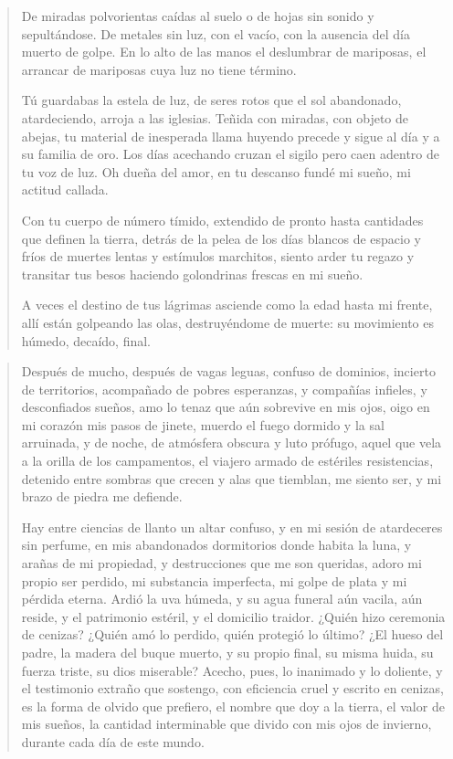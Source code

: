 \documentclass[12pt]{article}
\begin{document}
\clearpage
{}
\begin{verse}
De miradas polvorientas caídas al suelo  
o de hojas sin sonido y sepultándose.  
De metales sin luz, con el vacío,  
con la ausencia del día muerto de golpe.  
En lo alto de las manos el deslumbrar de mariposas,  
el arrancar de mariposas cuya luz no tiene término.  
  
Tú guardabas la estela de luz, de seres rotos  
que el sol abandonado, atardeciendo, arroja a las iglesias.  
Teñida con miradas, con objeto de abejas,  
tu material de inesperada llama huyendo  
precede y sigue al día y a su familia de oro.  
Los días acechando cruzan el sigilo  
pero caen adentro de tu voz de luz.  
Oh dueña del amor, en tu descanso  
fundé mi sueño, mi actitud callada.  
  
Con tu cuerpo de número tímido, extendido de pronto  
hasta cantidades que definen la tierra,  
detrás de la pelea de los días blancos de espacio  
y fríos de muertes lentas y estímulos marchitos,  
siento arder tu regazo y transitar tus besos  
haciendo golondrinas frescas en mi sueño.  
  
A veces el destino de tus lágrimas asciende  
como la edad hasta mi frente, allí  
están golpeando las olas, destruyéndome de muerte:  
su movimiento es húmedo, decaído, final.

\end{verse}

\clearpage
{}
\begin{verse}
Después de mucho, después de vagas leguas,  
confuso de dominios, incierto de territorios,  
acompañado de pobres esperanzas,  
y compañías infieles, y desconfiados sueños,  
amo lo tenaz que aún sobrevive en mis ojos,  
oigo en mi corazón mis pasos de jinete,  
muerdo el fuego dormido y la sal arruinada,  
y de noche, de atmósfera obscura y luto prófugo,  
aquel que vela a la orilla de los campamentos,  
el viajero armado de estériles resistencias,  
detenido entre sombras que crecen y alas que tiemblan,  
me siento ser, y mi brazo de piedra me defiende.  
  
Hay entre ciencias de llanto un altar confuso,  
y en mi sesión de atardeceres sin perfume,  
en mis abandonados dormitorios donde habita la luna,  
y arañas de mi propiedad, y destrucciones que me son queridas,  
adoro mi propio ser perdido, mi substancia imperfecta,  
mi golpe de plata y mi pérdida eterna.  
Ardió la uva húmeda, y su agua funeral  
aún vacila, aún reside,  
y el patrimonio estéril, y el domicilio traidor.  
¿Quién hizo ceremonia de cenizas?  
¿Quién amó lo perdido, quién protegió lo último?  
¿El hueso del padre, la madera del buque muerto,  
y su propio final, su misma huida,  
su fuerza triste, su dios miserable?  
Acecho, pues, lo inanimado y lo doliente,  
y el testimonio extraño que sostengo,  
con eficiencia cruel y escrito en cenizas,  
es la forma de olvido que prefiero,  
el nombre que doy a la tierra, el valor de mis sueños,  
la cantidad interminable que divido  
con mis ojos de invierno, durante cada día de este mundo.

\end{verse}
\end{document}

